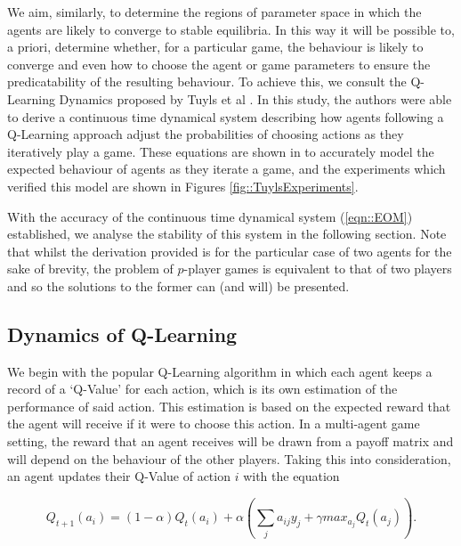 \documentclass[.../main.tex]{subfiles}
\begin{document}
    We aim, similarly, to determine the regions of parameter space in
    which the agents are likely to converge to stable equilibria. In
    this way it will be possible to, a priori, determine whether, for
    a particular game, the behaviour is likely to converge and even
    how to choose the agent or game parameters to ensure the
    predicatability of the resulting behaviour. To achieve this, we
    consult the Q-Learning Dynamics proposed by Tuyls et al
    \cite{Tuyls2006AnGames}. In this study, the authors were able to
    derive a continuous time dynamical system describing how agents
    following a Q-Learning approach adjust the probabilities of
    choosing actions as they iteratively play a game. These equations
    are shown in \cite{Tuyls2006AnGames} to accurately model the
    expected behaviour of agents as they iterate a game, and the
    experiments which verified this model are shown in Figures
    \ref{fig::TuylsExperiments}.

    With the accuracy of the continuous time dynamical system
    (\ref{eqn::EOM}) established, we analyse the stability of this
    system in the following section. Note that whilst the derivation
    provided is for the particular case of two agents for the sake of
    brevity, the problem of $p$-player games is equivalent to that of
    two players and so the solutions to the former can (and will) be
    presented.
    
    \subsection{Dynamics of Q-Learning} %
    \label{sub:dynamics_of_q_learning}
    
    We begin with the popular Q-Learning algorithm in which each agent keeps a record of a `Q-Value'
    for each action, which is its own estimation of the performance of said action. This estimation
    is based on the expected reward that the agent will receive if it were to choose this action. In
    a multi-agent game setting, the reward that an agent receives will be drawn from a payoff
    matrix and will depend on the behaviour of the other players. Taking this into consideration,
    an agent updates their Q-Value of action $i$ with the equation

    \begin{equation}
    \label{eq::Q-Learning}
    Q_{t+1}(a_i) = (1 - \alpha) Q_t(a_i) + \alpha (\sum_j a_{ij} y_{j} + \gamma max_{a_j}Q_t(a_j)).
    \end{equation}
\end{document}
